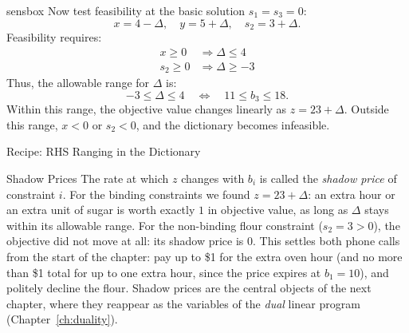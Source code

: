 \begin{steppanel}{sensbox}
Now test feasibility at the basic solution \( s_1 = s_3 = 0 \):
\[
x = 4 - \Delta, \quad
y = 5 + \Delta, \quad
s_2 = 3 + \Delta.
\]
Feasibility requires:
\[
\begin{aligned}
x \geq 0 &\Rightarrow \Delta \leq 4 \\
s_2 \geq 0 &\Rightarrow \Delta \geq -3
\end{aligned}
\]
Thus, the allowable range for \( \Delta \) is:
\[
\boxed{-3 \leq \Delta \leq 4}
\quad\Longleftrightarrow\quad
11 \leq b_3 \leq 18.
\]
Within this range, the objective value changes linearly as \( z = 23 + \Delta \). Outside this range, \( x < 0 \) or \( s_2 < 0 \), and the dictionary becomes infeasible.
\end{steppanel}

\begin{algocard}{Recipe: RHS Ranging in the Dictionary}
\end{algocard}

\begin{remark}{Shadow Prices}{}
The rate at which $z$ changes with $b_i$ is called the \emph{shadow price} of constraint $i$. For the binding constraints we found $z = 23 + \Delta$: an extra hour or an extra unit of sugar is worth exactly $1$ in objective value, as long as $\Delta$ stays within its allowable range. For the non-binding flour constraint ($s_2 = 3 > 0$), the objective did not move at all: its shadow price is $0$. This settles both phone calls from the start of the chapter: pay up to \$1 for the extra oven hour (and no more than \$1 total for up to one extra hour, since the price expires at $b_1 = 10$), and politely decline the flour. Shadow prices are the central objects of the next chapter, where they reappear as the variables of the \emph{dual} linear program (Chapter~\ref{ch:duality}).
\end{remark}

